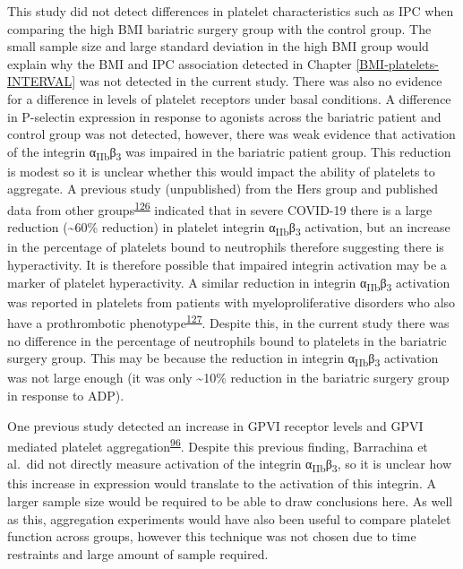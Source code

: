\documentclass[11pt,twoside]{bristolthesis}
\begin{document}
This study did not detect differences in platelet characteristics such as IPC when comparing the high BMI bariatric surgery group with the control group. The small sample size and large standard deviation in the high BMI group would explain why the BMI and IPC association detected in Chapter \ref{BMI-platelets-INTERVAL} was not detected in the current study. There was also no evidence for a difference in levels of platelet receptors under basal conditions. A difference in P-selectin expression in response to agonists across the bariatric patient and control group was not detected, however, there was weak evidence that activation of the integrin α\textsubscript{IIb}β\textsubscript{3} was impaired in the bariatric patient group. This reduction is modest so it is unclear whether this would impact the ability of platelets to aggregate. A previous study (unpublished) from the Hers group and published data from other groups\textsuperscript{\protect\hyperlink{ref-Taus2020}{126}} indicated that in severe COVID-19 there is a large reduction (\textasciitilde60\% reduction) in platelet integrin α\textsubscript{IIb}β\textsubscript{3} activation, but an increase in the percentage of platelets bound to neutrophils therefore suggesting there is hyperactivity. It is therefore possible that impaired integrin activation may be a marker of platelet hyperactivity. A similar reduction in integrin α\textsubscript{IIb}β\textsubscript{3} activation was reported in platelets from patients with myeloproliferative disorders who also have a prothrombotic phenotype\textsuperscript{\protect\hyperlink{ref-Moore2013}{127}}. Despite this, in the current study there was no difference in the percentage of neutrophils bound to platelets in the bariatric surgery group. This may be because the reduction in integrin α\textsubscript{IIb}β\textsubscript{3} activation was not large enough (it was only \textasciitilde10\% reduction in the bariatric surgery group in response to ADP).

One previous study detected an increase in GPVI receptor levels and GPVI mediated platelet aggregation\textsuperscript{\protect\hyperlink{ref-Barrachina2019}{96}}. Despite this previous finding, Barrachina et al.~did not directly measure activation of the integrin α\textsubscript{IIb}β\textsubscript{3}, so it is unclear how this increase in expression would translate to the activation of this integrin. A larger sample size would be required to be able to draw conclusions here. As well as this, aggregation experiments would have also been useful to compare platelet function across groups, however this technique was not chosen due to time restraints and large amount of sample required.
\end{document}
